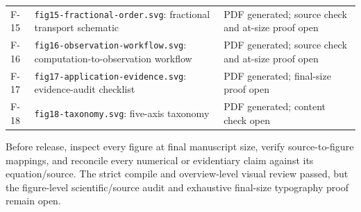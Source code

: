 \begin{table}[htbp]
\begin{tabularx}{\textwidth}{@{}p{2.6cm}X p{2.4cm}@{}}
F-15 & \texttt{fig15-fractional-order.svg}: fractional transport schematic & PDF generated; source check and at-size proof open \\
F-16 & \texttt{fig16-observation-workflow.svg}: computation-to-observation workflow & PDF generated; source check and at-size proof open \\
F-17 & \texttt{fig17-application-evidence.svg}: evidence-audit checklist & PDF generated; final-size proof open \\
F-18 & \texttt{fig18-taxonomy.svg}: five-axis taxonomy & PDF generated; content check open \\
\bottomrule
\end{tabularx}
\end{table}

Before release, inspect every figure at final manuscript size, verify source-to-figure mappings, and reconcile every numerical or evidentiary claim against its equation/source. The strict compile and overview-level visual review passed, but the figure-level scientific/source audit and exhaustive final-size typography proof remain open.
